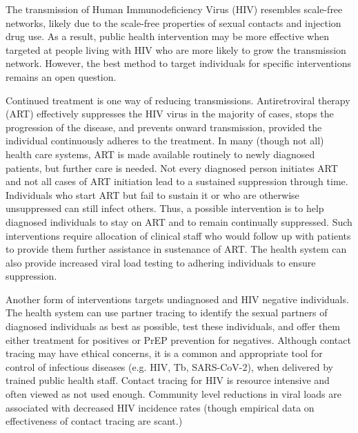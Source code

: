 \documentclass[a4paper,11pt]{article}
\begin{document}
The transmission of Human Immunodeficiency Virus (HIV) resembles scale-free networks,\supercite{Wertheim2014}
 likely due to the scale-free properties of sexual contacts and injection drug use.\supercite{Little2014,Schneeberger2004}
As a result, public health intervention may be more effective when targeted at people living with HIV  who are more likely to grow the transmission network.
However, the best method to target individuals for specific interventions remains an open question.

Continued treatment is one way of reducing  transmissions. 
Antiretroviral therapy (ART) effectively suppresses the HIV virus in the majority of cases, stops the progression of the disease, and prevents onward transmission, provided the individual continuously adheres to the treatment.\supercite{Cohen2011}
In  many (though not all) health care systems, ART is made available routinely  to newly diagnosed patients, but further care is needed. 
Not every diagnosed person initiates ART and not all cases of ART initiation lead to a sustained suppression  through time. 
Individuals who start ART but fail to sustain it or who are otherwise unsuppressed can still infect others. 
Thus, a possible intervention is to help diagnosed individuals to stay on ART and to remain continually suppressed.\supercite{Poon2016}
Such interventions require allocation of clinical staff who would follow up with patients to provide them further assistance in  sustenance of ART.
The health system can also provide increased viral load testing to adhering individuals to ensure suppression.  

Another form of interventions targets undiagnosed and HIV negative  individuals.
The health system can use partner tracing to identify the sexual partners of diagnosed individuals as best as possible, test these individuals, and offer them either treatment for positives or  PrEP prevention for negatives.\supercite{Gotz2014} 
Although contact tracing may have ethical concerns, it is a common and appropriate tool for control of infectious diseases (e.g. HIV, Tb, SARS-CoV-2), when delivered by trained public health staff. \supercite{Guttman2020} 
Contact tracing for HIV is resource intensive and often viewed as not used enough.\supercite{Katz2010} 
Community level reductions in viral loads are associated with decreased HIV incidence rates\supercite{Das2010} (though empirical data on effectiveness of contact tracing are scant.\supercite{Hogben2007})
\end{document}
